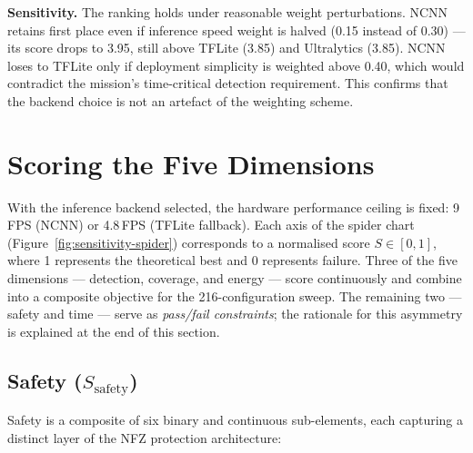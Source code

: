 \documentclass[10pt,a4paper]{article}
\begin{document}
\textbf{Sensitivity.} The ranking holds under reasonable weight perturbations. NCNN retains first place even if inference speed weight is halved (0.15 instead of 0.30) --- its score drops to 3.95, still above TFLite (3.85) and Ultralytics (3.85). NCNN loses to TFLite only if deployment simplicity is weighted above 0.40, which would contradict the mission's time-critical detection requirement. This confirms that the backend choice is not an artefact of the weighting scheme.

\section{Scoring the Five Dimensions}\label{sec:df-scoring}

With the inference backend selected, the hardware performance ceiling is fixed: 9\,FPS (NCNN) or 4.8\,FPS (TFLite fallback). Each axis of the spider chart (Figure~\ref{fig:sensitivity-spider}) corresponds to a normalised score $S \in [0,1]$, where 1 represents the theoretical best and 0 represents failure. Three of the five dimensions --- detection, coverage, and energy --- score continuously and combine into a composite objective for the 216-configuration sweep. The remaining two --- safety and time --- serve as \emph{pass/fail constraints}; the rationale for this asymmetry is explained at the end of this section.

\subsection{Safety (\texorpdfstring{$S_\text{safety}$}{S\_safety})}\label{sec:score-safety}

Safety is a composite of six binary and continuous sub-elements, each capturing a distinct layer of the NFZ protection architecture:
\end{document}
